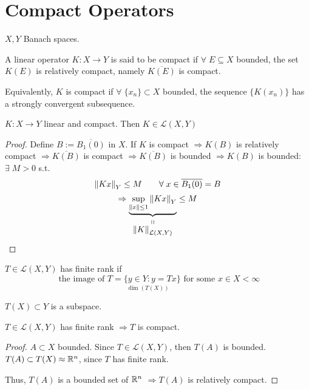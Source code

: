 \newpage
\section{Compact Operators}
\(X, Y\) Banach spaces. 
\begin{definition}
    A linear operator \(K:X \to Y\) is said to be compact if \(\forall \; E \subseteq X\) bounded, the set \(K(E)\) is relatively compact, namely \(\overline{K(E)}\) is compact. 

    Equivalently, \(K\) is compact if \(\forall \; \{x_n\} \subset X \) bounded, the sequence \(\{K(x_n)\}\) has a strongly convergent subsequence. 
\end{definition}
\begin{proposition}
    \(K:X \to Y\) linear and compact. Then \(K \in \mathcal{L}(X, Y)\)
\end{proposition}
\begin{proof}
    Define \(B:=\overline{B_1(0)}\) in \(X\). If \(K\) is compact 
    \(\Rightarrow K(B) \) is relatively compact 
    \(\Rightarrow \overline{K(B)}\) is compact 
    \(\Rightarrow \overline{K(B)}\) is bounded
    \(\Rightarrow K(B)\) is bounded: \(\exists \; M>0 \) s.t. 
    \[
        \norm{Kx}_Y \leq M \qquad \forall \; x \in \overline{B_1(0)} = B
    \]
    \[
        \Rightarrow \stackbelow{\underbrace{\sup_{\norm{x} \leq 1} \norm{Kx}_Y}}{\norm{K}_{\mathcal{L}(X, Y)}} \leq M
    \]
\end{proof}

\begin{definition}
    \(T \in \mathcal{L}(X, Y)\) has finite rank if 
    \[
        \underset{\dim (T(X))}{\text{ the image of }T= \{y \in Y: y = Tx\} \text{ for some } x \in X} < \infty
    \]
\end{definition}
\(T(X) \subset Y\) is a subspace.
\begin{proposition}
    \(T \in \mathcal{L}(X, Y)\) has finite rank \(\Rightarrow T\) is compact.
\end{proposition}
\begin{proof}
    \(A \subset X \) bounded. Since \(T \in \mathcal{L}(X, Y)\), then \(T(A)\) is bounded. \(T(A) \subset T(X) \approx \real^n\), since \(T\) has finite rank. 
    
    Thus, \(T(A)\) is a bounded set of \(\real^n\) \(\Rightarrow T(A) \) is relatively compact. 
\end{proof}

